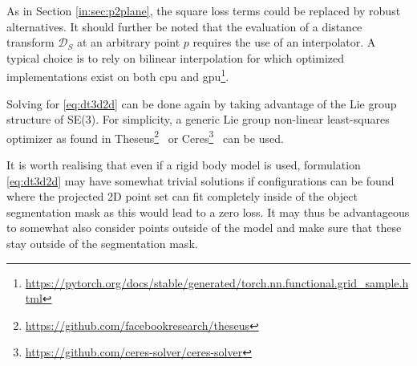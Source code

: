 As in Section \ref{in:sec:p2plane}, the square loss terms could be replaced by robust alternatives.
It should further be noted that the evaluation of a distance transform $\mathcal{D}_{S}$ at an arbitrary point $p$ requires the use of an interpolator.
A typical choice is to rely on bilinear interpolation for which optimized implementations exist on both \acrshort{cpu} and \acrshort{gpu}\footnote{\url{https://pytorch.org/docs/stable/generated/torch.nn.functional.grid_sample.html}}.

Solving for \eqref{eq:dt3d2d} can be done again by taking advantage of the Lie group structure of SE(3). For simplicity, a generic Lie group non-linear least-squares optimizer as found in Theseus\footnote{\url{https://github.com/facebookresearch/theseus}}~\cite{Pineda:NeurIPS:2023} or Ceres\footnote{\url{https://github.com/ceres-solver/ceres-solver}}~\cite{Agarwal:Ceres:2022} can be used.

It is worth realising that even if a rigid body model is used, formulation \eqref{eq:dt3d2d} may have somewhat trivial solutions if configurations can be found where the projected 2D point set can fit completely inside of the object segmentation mask as this would lead to a zero loss. It may thus be advantageous to somewhat also consider points outside of the model and make sure that these stay outside of the segmentation mask.
